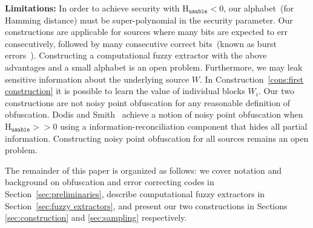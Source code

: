 \documentclass[11pt]{article}
\newcommand{\secref}[1]{\mbox{Section~\ref{#1}}}
\newcommand{\consref}[1]{\mbox{Construction~\ref{#1}}}
\newcommand{\Huse}{\mathrm{H}_{\mathtt{usable}}}
\begin{document}

\textbf{Limitations: } In order to achieve security with $\Huse<0$, our alphabet~(for Hamming distance) must be super-polynomial in the security parameter.  Our constructions are applicable for sources where many bits are expected to err consecutively, followed by many consecutive correct bits~(known as burst errors~\cite{gilbert1960capacity}).  Constructing a computational fuzzy extractor with the above advantages and a small alphabet is an open problem.  Furthermore, we may leak sensitive information about the underlying source $W$.  In \consref{cons:first construction} it is possible to learn the value of individual blocks $W_i$.  Our two constructions are not noisy point obfuscation for any reasonable definition of obfuscation.  Dodis and Smith~\cite{DBLP:conf/stoc/DodisS05} achieve a notion of noisy point obfuscation when $\Huse>>0$ using a information-reconciliation component that hides all partial information.  Constructing noisy point obfuscation for all sources remains an open problem.

The remainder of this paper is organized as follows: we cover notation and background on obfuscation and error correcting codes in \secref{sec:preliminaries}, describe computational fuzzy extractors in \secref{sec:fuzzy extractors}, and present our two constructions in Sections \ref{sec:construction} and \ref{sec:sampling} respectively.
\end{document}
